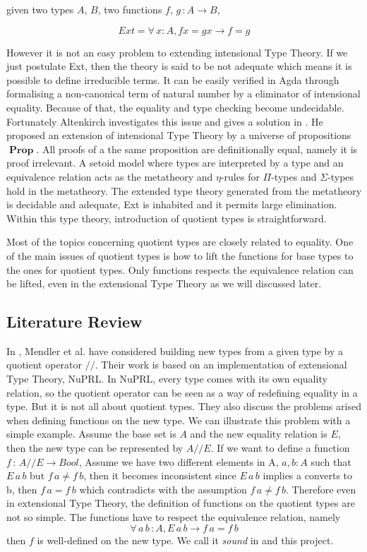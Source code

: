 \documentclass[envcountsame]{llncs}
\DeclareMathOperator{\Prop}{\mathbf{Prop}}
\newcommand{\itt}{intensional Type Theory}
\newcommand{\ett}{extensional Type Theory}
\begin{document}
given two types $A,\,B$, two functions $f,\,g\,\colon A \to B$,

\[Ext = \forall\, x\colon A, f x = g x \to f = g\]

However it is not an easy problem to extending \itt{}. If we just
postulate Ext, then the theory
is said to be not adequate which means it is possible to define
irreducible terms. It can be easily verified in Agda through formalising a non-canonical term
of natural number by a eliminator of intensional equality. Because of
that, the equality and type checking become undecidable. Fortunately Altenkirch investigates this
issue and gives a solution in \cite{alt:99}. He proposed an extension
of \itt{} by a universe of propositions $\Prop$. All proofs of a
the same proposition are definitionally equal, namely it is proof
irrelevant. A setoid model where types are interpreted by a type and
an equivalence relation acts as the metatheory and $\eta$-rules for
$\Pi$-types and $\Sigma$-types hold in the metatheory. The extended type
theory generated from the metatheory is decidable and adequate, Ext is
inhabited and it permits large elimination. Within this type theory,
introduction of quotient types is straightforward.

Most of the topics concerning quotient types are closely related to equality.
One of the main issues of quotient types is how to lift the functions for
base types to the ones for quotient types. Only functions respects the
equivalence relation can be lifted, even in the extensional Type
Theory as we will discussed later.

\subsection{Literature Review}

In \cite{cab}, Mendler et al. have considered building new types from a
given type by  a quotient operator $//$. Their work is based on an
implementation of extensional Type Theory, NuPRL. In NuPRL, every type
comes with its own equality relation, so the quotient operator can be
seen as a way of redefining equality in a type. But it is not all
about quotient types. They also discuss the problems arised when
defining functions on the new type.
We can illustrate this problem with a simple example. Assume the base
set is $A$ and the new equality relation is $E$, then the new
type can be represented by $A//E$. If we want to define a function $f
\,\colon\, A//E \to Bool$,  Assume we have two different elements in
A, $a, b \colon A$ such that $E\,a\,b$ but $f\,a \not= f\,b$, then it
becomes inconsistent since $E\,a\,b$ implies a converts to b, then
$f\,a = f\,b$ which contradicts with the assumption $f\,a \not=
f\,b$. Therefore even in \ett{}, the definition of functions on the
quotient types are not so simple. The functions have
to respect the equivalence relation, namely$$\forall \, a\,b\,\colon A, E\,a\,b \to f\,a = f\,b$$
then $f$ is well-defined on the new type. We call it \emph{sound} in
\cite{aan} and this project.
\end{document}
